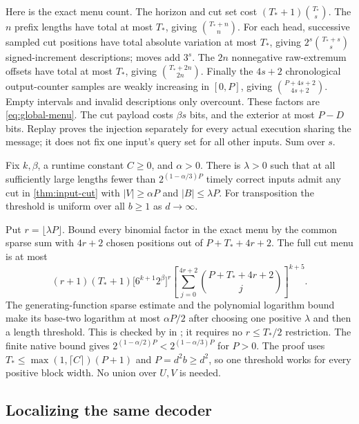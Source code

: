 \begin{outline}
Here is the exact menu count. The horizon and cut set cost
$(T_*+1)\binom{T_*}{s}$. The $n$ prefix lengths have total at most $T_*$,
giving $\binom{T_*+n}{n}$. For each head, successive sampled cut positions
have total absolute variation at most $T_*$, giving
$2^s\binom{T_*+s}{s}$ signed-increment descriptions; moves add $3^s$.
The $2n$ nonnegative raw-extremum offsets have total at most $T_*$, giving
$\binom{T_*+2n}{2n}$. Finally the $4s+2$ chronological output-counter
samples are weakly increasing in $[0,P]$, giving
$\binom{P+4s+2}{4s+2}$. Empty intervals and invalid descriptions only
overcount. These factors are \cref{eq:global-menu}. The cut payload costs
$\beta s$ bits, and the exterior at most $P-D$ bits. Replay proves the
injection separately for every actual execution sharing the message; it
does not fix one input's query set for all other inputs. Sum over $s$.
\end{outline}

\begin{corollary}\label{cor:input-expansion}
Fix $k,\beta$, a runtime constant $C\ge0$, and $\alpha>0$. There is
$\lambda>0$ such that at all sufficiently large lengths fewer than
$2^{(1-\alpha/3)P}$ timely correct inputs admit any cut in
\cref{thm:input-cut} with $|V|\ge\alpha P$ and $|B|\le\lambda P$.
For transposition the threshold is uniform over all $b\ge1$ as $d\to\infty$.
\end{corollary}
\begin{outline}
Put $r=\lfloor\lambda P\rfloor$. Bound every binomial factor in the exact
menu by the common sparse sum with $4r+2$ chosen positions out of
$P+T_*+4r+2$. The full cut menu is at most
\[
 (r+1)(T_*+1)\bigl[6^{k+1}2^\beta\bigr]^r
 \left[\sum_{j=0}^{4r+2}\binom{P+T_*+4r+2}{j}\right]^{k+5}.
\]
The generating-function sparse estimate and the polynomial logarithm bound
make its base-two logarithm at most $\alpha P/2$ after choosing one positive
$\lambda$ and then a length threshold. This is checked by
 in ;
it requires no $r\le T_*/2$ restriction. The finite native bound gives
$2^{(1-\alpha/2)P}<2^{(1-\alpha/3)P}$ for $P>0$. The proof uses
$T_*\le\max(1,\lceil C\rceil)(P+1)$ and $P=d^2b\ge d^2$, so one threshold
works for every positive block width. No union over $U,V$ is needed.
\end{outline}

\subsection{Localizing the same decoder}

